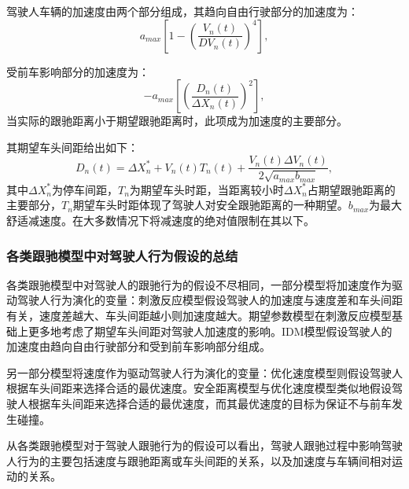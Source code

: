 %

驾驶人车辆的加速度由两个部分组成，其趋向自由行驶部分的加速度为：
\begin{equation}
a_{max}\left[1-\left(\frac{V_n(t)}{DV_n(t)}\right)^4\right],
\end{equation}

受前车影响部分的加速度为：
\begin{equation}
-a_{max}\left[\left(\frac{D_n(t)}{\Delta X_n(t)}\right )^2\right],
\end{equation}
当实际的跟驰距离小于期望跟驰距离时，此项成为加速度的主要部分。

其期望车头间距给出如下：
\begin{equation}
D_n(t)=\Delta X_n^*+V_n(t)T_n(t)+\frac{V_n(t)\Delta V_n(t)}{2\sqrt{a_{max}b_{max}}},
\end{equation}
其中$\Delta X_n^*$为停车间距，$T_n$为期望车头时距，当距离较小时$\Delta X_n^*$占期望跟驰距离的主要部分，$T_n$期望车头时距体现了驾驶人对安全跟驰距离的一种期望。$b_{max}$为最大舒适减速度。在大多数情况下将减速度的绝对值限制在其以下。


\subsubsection{各类跟驰模型中对驾驶人行为假设的总结}

各类跟驰模型中对驾驶人的跟驰行为的假设不尽相同，一部分模型将加速度作为驱动驾驶人行为演化的变量：刺激反应模型假设驾驶人的加速度与速度差和车头间距有关，速度差越大、车头间距越小则加速度越大。期望参数模型在刺激反应模型基础上更多地考虑了期望车头间距对驾驶人加速度的影响。IDM模型假设驾驶人的加速度由趋向自由行驶部分和受到前车影响部分组成。

另一部分模型将速度作为驱动驾驶人行为演化的变量：优化速度模型则假设驾驶人根据车头间距来选择合适的最优速度。安全距离模型与优化速度模型类似地假设驾驶人根据车头间距来选择合适的最优速度，而其最优速度的目标为保证不与前车发生碰撞。

从各类跟驰模型对于驾驶人跟驰行为的假设可以看出，驾驶人跟驰过程中影响驾驶人行为的主要包括速度与跟驰距离或车头间距的关系，以及加速度与车辆间相对运动的关系。

